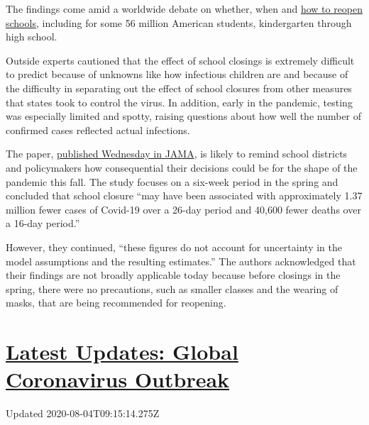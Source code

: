 The findings come amid a worldwide debate on whether, when and
\href{https://www.nytimes3xbfgragh.onion/interactive/2020/07/31/us/coronavirus-school-reopening-risk.html}{how
to reopen schools}, including for some 56 million American students,
kindergarten through high school.

Outside experts cautioned that the effect of school closings is
extremely difficult to predict because of unknowns like how infectious
children are and because of the difficulty in separating out the effect
of school closures from other measures that states took to control the
virus. In addition, early in the pandemic, testing was especially
limited and spotty, raising questions about how well the number of
confirmed cases reflected actual infections.

The paper,
\href{https://jamanetwork.com/journals/jama/fullarticle/10.1001/jama.2020.14348}{published
Wednesday in JAMA}, is likely to remind school districts and
policymakers how consequential their decisions could be for the shape of
the pandemic this fall. The study focuses on a six-week period in the
spring and concluded that school closure ``may have been associated with
approximately 1.37 million fewer cases of Covid-19 over a 26-day period
and 40,600 fewer deaths over a 16-day period.''

However, they continued, ``these figures do not account for uncertainty
in the model assumptions and the resulting estimates.'' The authors
acknowledged that their findings are not broadly applicable today
because before closings in the spring, there were no precautions, such
as smaller classes and the wearing of masks, that are being recommended
for reopening.

\hypertarget{latest-updates-global-coronavirus-outbreak}{%
\section{\texorpdfstring{\href{https://www.nytimes3xbfgragh.onion/2020/08/04/world/coronavirus-covid-19.html?action=click\&pgtype=Article\&state=default\&region=MAIN_CONTENT_1\&context=storylines_live_updates}{Latest
Updates: Global Coronavirus
Outbreak}}{Latest Updates: Global Coronavirus Outbreak}}\label{latest-updates-global-coronavirus-outbreak}}

Updated 2020-08-04T09:15:14.275Z

